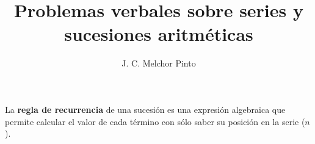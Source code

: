 \documentclass[12pt,addpoints,answers]{guia}
\title{Problemas verbales sobre series y sucesiones aritméticas}
\author{J. C. Melchor Pinto}
\begin{document}
\pagestyle{headandfoot}

\INFO
\printanswers
\vspace{-2em}
\begin{multicols}{2}
    
    
    
    \columnbreak
    
    
\end{multicols}
\begin{importantbox}
    La \textbf{regla de recurrencia} de una sucesión es una expresión algebraica que permite calcular el valor de cada término con sólo saber su posición en la serie ($n$).
\end{importantbox}
\begin{questions}
    \questionboxed[10]{}
    \questionboxed[10]{}
    \questionboxed[10]{}
    \questionboxed[10]{}
    \questionboxed[10]{}
    \questionboxed[10]{}
    \questionboxed[10]{}
    \questionboxed[10]{}
    \questionboxed[10]{}
    \questionboxed[10]{}
\end{questions}
\end{document}
